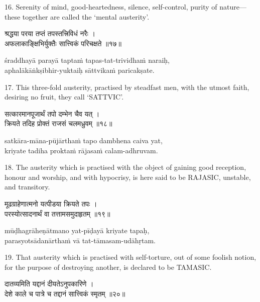 16. Serenity of mind, good-heartedness, silence, self-control, purity of
nature---these together are called the `mental austerity'.

\begin{gitaverse}
श्रद्धया परया तप्तं तपस्तत्त्रिविधं नरैः । \\
अफलाकाङ्क्षिभिर्युक्तैः सात्त्विकं परिचक्षते ॥१७॥
\end{gitaverse}

\begin{transliteration}
śraddhayā parayā taptaṁ tapas-tat-trividhaṁ naraiḥ, \\
aphalākāṅkṣibhir-yuktaiḥ sāttvikaṁ paricakṣate.
\end{transliteration}

17. This three-fold austerity, practised by steadfast men, with the utmost
faith, desiring no fruit, they call `SATTVIC'.

\begin{gitaverse}
सत्कारमानपूजार्थं तपो दम्भेन चैव यत् । \\
क्रियते तदिह प्रोक्तं राजसं चलमध्रुवम् ॥१८॥
\end{gitaverse}

\begin{transliteration}
satkāra-māna-pūjārthaṁ tapo dambhena caiva yat, \\
kriyate tadiha proktaṁ rājasaṁ calam-adhruvam.
\end{transliteration}

18. The austerity which is practised with the object of gaining good reception,
honour and worship, and with hypocrisy, is here said to be RAJASIC, unstable,
and transitory.

\begin{gitaverse}
मूढग्राहेणात्मनो यत्पीडया क्रियते तपः । \\
परस्योत्सादनार्थं वा तत्तामसमुदाहृतम् ॥१९॥
\end{gitaverse}

\begin{transliteration}
mūḍhagrāheṇātmano yat-pīḍayā kriyate tapaḥ, \\
parasyotsādanārthaṁ vā tat-tāmasam-udāhṛtam.
\end{transliteration}

19. That austerity which is practised with self-torture, out of some foolish
notion, for the purpose of destroying another, is declared to be TAMASIC.\@

\begin{gitaverse}
दातव्यमिति यद्दानं दीयतेऽनुपकारिणे । \\
देशे काले च पात्रे च तद्दानं सात्त्विकं स्मृतम् ॥२०॥
\end{gitaverse}


